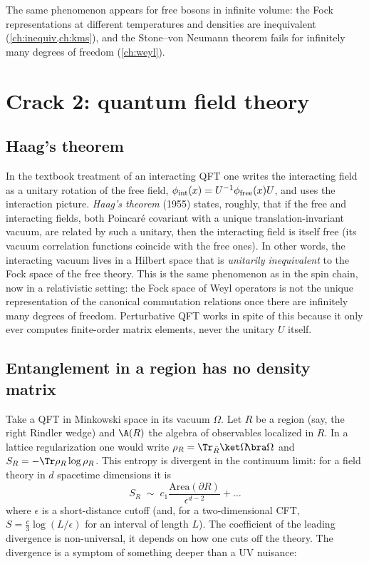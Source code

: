 The same phenomenon appears for free bosons in infinite volume: the Fock representations at different temperatures and densities are inequivalent (\cref{ch:inequiv,ch:kms}), and the Stone--von Neumann theorem fails for infinitely many degrees of freedom (\cref{ch:weyl}).

\section{Crack 2: quantum field theory}

\subsection{Haag's theorem}

In the textbook treatment of an interacting QFT one writes the interacting field as a unitary rotation of the free field, $\phi_{\rm int}(x)=U^{-1}\phi_{\rm free}(x)U$, and uses the interaction picture. \emph{Haag's theorem} (1955) states, roughly, that if the free and interacting fields, both Poincar\'e covariant with a unique translation-invariant vacuum, are related by such a unitary, then the interacting field is itself free (its vacuum correlation functions coincide with the free ones). In other words, the interacting vacuum lives in a Hilbert space that is \emph{unitarily inequivalent} to the Fock space of the free theory. This is the same phenomenon as in the spin chain, now in a relativistic setting: the Fock space of Weyl operators is not the unique representation of the canonical commutation relations once there are infinitely many degrees of freedom. Perturbative QFT works in spite of this because it only ever computes finite-order matrix elements, never the unitary $U$ itself.

\subsection{Entanglement in a region has no density matrix}

Take a QFT in Minkowski space in its vacuum $\Omega$. Let $R$ be a region (say, the right Rindler wedge) and $\A(R)$ the algebra of observables localized in $R$. In a lattice regularization one would write $\rho_R=\Tr_{\bar R}\ket\Omega\!\bra\Omega$ and $S_R=-\Tr\rho_R\log\rho_R$. This entropy is divergent in the continuum limit: for a field theory in $d$ spacetime dimensions it is
\begin{equation}
S_R\;\sim\;c_1\frac{\mathrm{Area}(\partial R)}{\epsilon^{d-2}}+\dots
\end{equation}
where $\epsilon$ is a short-distance cutoff (and, for a two-dimensional CFT, $S=\tfrac{c}{3}\log(L/\epsilon)$ for an interval of length $L$). The coefficient of the leading divergence is non-universal, it depends on how one cuts off the theory. The divergence is a symptom of something deeper than a UV nuisance:

